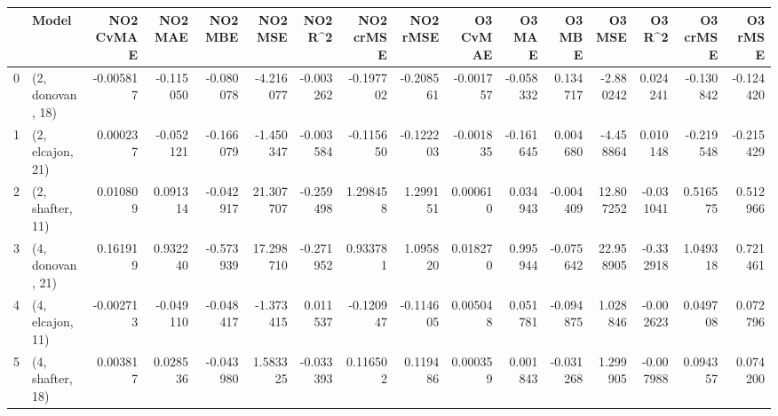 \begin{tabular}{llrrrrrrrrrrrrrr}
\toprule
{} &             Model &  NO2 CvMAE &   NO2 MAE &   NO2 MBE &    NO2 MSE &   NO2 R\textasciicircum2 &  NO2 crMSE &  NO2 rMSE &  O3 CvMAE &    O3 MAE &    O3 MBE &     O3 MSE &    O3 R\textasciicircum2 &  O3 crMSE &   O3 rMSE \\
\midrule
0 &  (2, donovan, 18) &  -0.005817 & -0.115050 & -0.080078 &  -4.216077 & -0.003262 &  -0.197702 & -0.208561 & -0.001757 & -0.058332 &  0.134717 &  -2.880242 &  0.024241 & -0.130842 & -0.124420 \\
1 &  (2, elcajon, 21) &   0.000237 & -0.052121 & -0.166079 &  -1.450347 & -0.003584 &  -0.115650 & -0.122203 & -0.001835 & -0.161645 &  0.004680 &  -4.458864 &  0.010148 & -0.219548 & -0.215429 \\
2 &  (2, shafter, 11) &   0.010809 &  0.091314 & -0.042917 &  21.307707 & -0.259498 &   1.298458 &  1.299151 &  0.000610 &  0.034943 & -0.004409 &  12.807252 & -0.031041 &  0.516575 &  0.512966 \\
3 &  (4, donovan, 21) &   0.161919 &  0.932240 & -0.573939 &  17.298710 & -0.271952 &   0.933781 &  1.095820 &  0.018270 &  0.995944 & -0.075642 &  22.958905 & -0.332918 &  1.049318 &  0.721461 \\
4 &  (4, elcajon, 11) &  -0.002713 & -0.049110 & -0.048417 &  -1.373415 &  0.011537 &  -0.120947 & -0.114605 &  0.005048 &  0.051781 & -0.094875 &   1.028846 & -0.002623 &  0.049708 &  0.072796 \\
5 &  (4, shafter, 18) &   0.003817 &  0.028536 & -0.043980 &   1.583325 & -0.033393 &   0.116502 &  0.119486 &  0.000359 &  0.001843 & -0.031268 &   1.299905 & -0.007988 &  0.094357 &  0.074200 \\
\bottomrule
\end{tabular}
